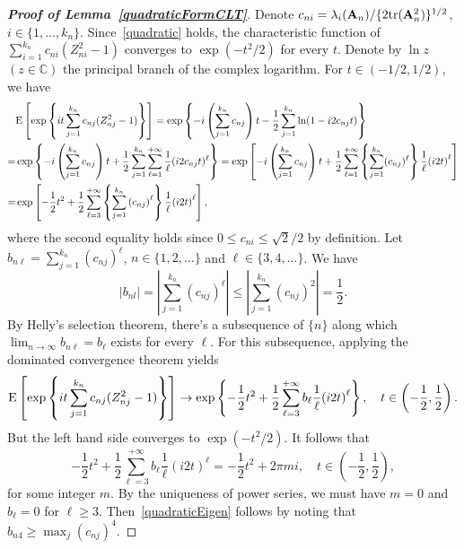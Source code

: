 \documentclass[times,sort&compress,3p]{elsarticle}
\newcommand{\mytr}{ {\rm tr} }
\newcommand{\myE}{ {\rm E} }
\newcommand{\BA}{\mathbf{A}}    \newcommand{\BB}{\mathbf{B}}    \newcommand{\BC}{\mathbf{C}}    \newcommand{\BD}{\mathbf{D}}    \newcommand{\BE}{\mathbf{E}}    \newcommand{\BF}{\mathbf{F}}    \newcommand{\BG}{\mathbf{G}}    \newcommand{\BH}{\mathbf{H}}    \newcommand{\BI}{\mathbf{I}}    \newcommand{\BJ}{\mathbf{J}}    \newcommand{\BK}{\mathbf{K}}    \newcommand{\BL}{\mathbf{L}}
\theoremstyle{plain}
\theoremstyle{definition}
\theoremstyle{remark}
\begin{document}
\begin{appendices}
\begin{proof}[\textbf{Proof of Lemma~\ref{quadraticFormCLT}}]
    Denote $c_{ni}=\lambda_i(\BA_n)/\{2\mytr(\BA_n^2)\}^{1/2}$, $i\in\{1,\ldots,k_n\}$.
    Since~\eqref{quadratic} holds, the characteristic function of
        $
        \sum_{i=1}^{k_n}c_{ni}(Z_{ni}^2-1)
    $
    converges to $\exp(-t^2/2)$ for every $t$.
    Denote by $\ln z$ $(z\in\mathbb{C})$ the principal branch of the complex logarithm.
    For $t\in (-1/2,1/2)$, we have
        \begin{align*}
            &\myE\left[\exp\left\{it \sum_{j=1}^{k_n}c_{nj}(Z_{nj}^2-1)\right\}\right]
            =
            \exp\left\{-i\left(\sum_{j=1}^{k_n}c_{nj}\right)t-
        \frac{1}{2}\sum_{j=1}^{k_n}\ln (1-i2c_{nj}t ) \right\}\\
            =&
            \exp\left\{
            -i\left(\sum_{j=1}^{k_n}c_{nj}\right) t+
            \frac{1}{2}\sum_{j=1}^{k_n}\sum_{\ell=1}^{+\infty}\frac{1}{\ell}(i2c_{nj}t )^\ell
        \right\}
            =
            \exp\left[
            -i\left(\sum_{j=1}^{k_n}c_{nj}\right) t+
        \frac{1}{2}\sum_{\ell=1}^{+\infty}\left\{\sum_{j=1}^{k_n}(c_{nj})^\ell\right\}\frac{1}{\ell}{(i2t)}^\ell\right]\\
            =&
            \exp\left[
            -\frac{1}{2}t^2+
        \frac{1}{2}\sum_{\ell=3}^{+\infty}\left\{\sum_{j=1}^{k_n}{(c_{nj})}^\ell\right\}\frac{1}{\ell}{(i2t)}^\ell \right],
        \end{align*}
    where the second equality holds since $0\leq c_{ni}\leq \sqrt{2}/2$ by definition.
    Let $b_{n\ell}=\sum_{j=1}^{k_n}{(c_{nj})}^\ell$, $n\in\{1,2,\ldots\}$ and $\ell\in\{3,4,\ldots\}$.
    We have
    $$\left|b_{nl}\right|=\left|\sum_{j=1}^{k_n}{(c_{nj})}^\ell\right|\leq \left|\sum_{j=1}^{k_n}{(c_{nj})}^2\right|=\frac{1}{2}.$$
    By Helly's selection theorem, there's a subsequence of $\{n\}$ along which $\lim_{n\to \infty}b_{n\ell}=b_\ell$ exists for every $\ell$.
    For this subsequence, applying the dominated convergence theorem yields
            $$\myE \left[\exp\left\{it \sum_{j=1}^{k_n}c_{nj}(Z_{nj}^2-1)\right\}\right]
            \to
            \exp\left\{
            -\frac{1}{2}t^2+
        \frac{1}{2}\sum_{\ell=3}^{+\infty}b_\ell\frac{1}{\ell}{(i2t)}^\ell\right\},
            \quad t\in\left(-\frac{1}{2},\frac{1}{2}\right).
            $$
            But the left hand side converges to $\exp(-t^2/2)$.
            It follows that
            $$
            -\frac{1}{2}t^2+
            \frac{1}{2}\sum_{\ell=3}^{+\infty}b_\ell\frac{1}{\ell}{(i2t)}^\ell
            =-\frac{1}{2}t^2+ 2\pi m i,
            \quad t\in\left(-\frac{1}{2},\frac{1}{2}\right),
            $$
            for some integer $m$.
            By the uniqueness of power series, we must have $m=0$ and $b_\ell=0$ for $\ell\geq 3$. Then~\eqref{quadraticEigen} follows by noting that $b_{n4}\geq \max_j{(c_{nj})}^4$.
\end{proof}






\end{appendices}
\end{document}
